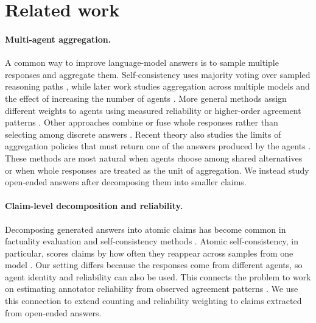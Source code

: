 \documentclass{article}
\begin{document}
\section{Related work}
\label{sec:related}

\paragraph{Multi-agent aggregation.}
A common way to improve language-model answers is to sample multiple responses and aggregate them. Self-consistency uses majority voting over sampled reasoning paths \cite{wang2022self}, while later work studies aggregation across multiple models and the effect of increasing the number of agents \cite{li2024agents}. More general methods assign different weights to agents using measured reliability or higher-order agreement patterns \cite{ai2025majority}. Other approaches combine or fuse whole responses rather than selecting among discrete answers \cite{jiang2023llm,chen2023universal}. Recent theory also studies the limits of aggregation policies that must return one of the answers produced by the agents \cite{ananthakrishnan2026power}. These methods are most natural when agents choose among shared alternatives or when whole responses are treated as the unit of aggregation. We instead study open-ended answers after decomposing them into smaller claims.

\paragraph{Claim-level decomposition and reliability.}
Decomposing generated answers into atomic claims has become common in factuality evaluation and self-consistency methods \cite{thirukovalluru2024atomic,zhang2024atomic,ning2025mad,wan2025fastfact,liu2025verifact,goel2025zero,panou2025harnessing}. Atomic self-consistency, in particular, scores claims by how often they reappear across samples from one model \cite{thirukovalluru2024atomic}. Our setting differs because the responses come from different agents, so agent identity and reliability can also be used. This connects the problem to work on estimating annotator reliability from observed agreement patterns \cite{dawid1979maximum,sinha2018fast,majdi2023crowd,kuzin2025improving}. We use this connection to extend counting and reliability weighting to claims extracted from open-ended answers.
\end{document}

